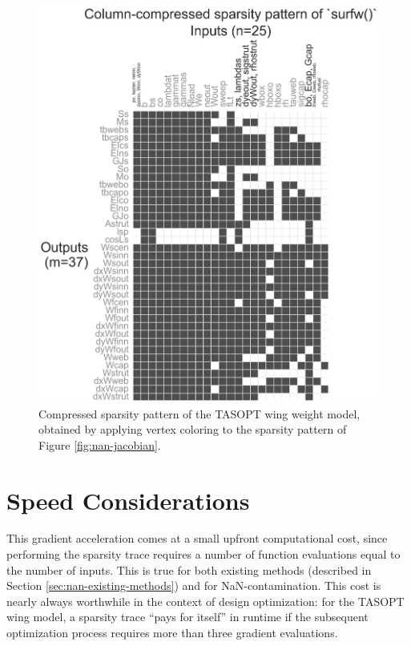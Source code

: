 \begin{figure}[H]
    \centering
    \includegraphics[width=5in]{../figures/nan-propagation/image3-crop.png}
    \caption{Compressed sparsity pattern of the TASOPT wing weight model, obtained by applying vertex coloring to the sparsity pattern of Figure \ref{fig:nan-jacobian}.}
    \label{fig:nan-jacobian-compressed}
\end{figure}


\section{Speed Considerations}

This gradient acceleration comes at a small upfront computational cost, since performing the sparsity trace requires a number of function evaluations equal to the number of inputs. This is true for both existing methods (described in Section \ref{sec:nan-existing-methods}) and for NaN-contamination. This cost is nearly always worthwhile in the context of design optimization: for the TASOPT wing model, a sparsity trace ``pays for itself'' in runtime if the subsequent optimization process requires more than three gradient evaluations.

